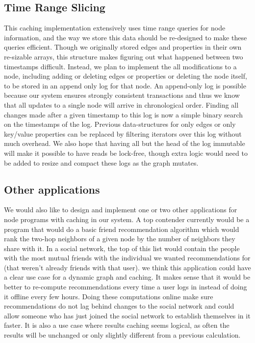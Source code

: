 \documentclass[letterpaper,twocolumn,11pt,tight]{article}
\begin{document}
\subsection{Time Range Slicing}
This caching implementation extensively uses time range queries for node information, and the way we store this data should be re-designed to make these queries efficient. Though we originally stored edges and properties in their own re-sizable arrays, this structure makes figuring out what happened between two timestamps difficult. Instead, we plan to implement the all modifications to a node, including adding or deleting edges or properties or deleting the node itself, to be stored in an append only log for that node. An append-only log is possible because our system ensures strongly consistent transactions and thus we know that all updates to a single node will arrive in chronological order. Finding all changes made after a given timestamp to this log is now a simple binary search on the timestamps of the log. Previous data-structures for only edges or only key/value properties can be replaced by filtering iterators over this log without much overhead. We also hope that having all but the head of the log immutable will make it possible to have reads be lock-free, though extra logic would need to be added to resize and compact these logs as the graph mutates.
\subsection{Other applications}
We would also like to design and implement one or two other applications for node programs with caching in our system. A top contender currently would be a program that would do a basic friend recommendation algorithm which would rank the two-hop neighbors of a given node by the number of neighbors they share with it. In a social network, the top of this list would contain the people with the most mutual friends with the individual we wanted recommendations for (that weren't already friends with that user). we think this application could have a clear use case for a dynamic graph and caching. It makes sense that it would be better to re-compute recommendations every time a user logs in instead of doing it offline every few hours. Doing these computations online make sure recommendations do not lag behind changes to the social network and could allow someone who has just joined the social network to establish themselves in it faster. It is also a use case where results caching seems logical, as often the results will be unchanged or only slightly different from a previous calculation.
\end{document}
